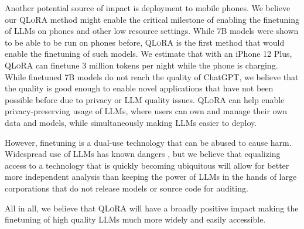 Another potential source of impact is deployment to mobile phones. We believe our \textsc{QLoRA} method might enable the critical milestone of enabling the finetuning of LLMs on phones and other low resource settings. While 7B models were shown to be able to be run on phones before, \textsc{QLoRA} is the first method that would enable the finetuning of such models. We estimate that with an iPhone 12 Plus, \textsc{QLoRA} can finetune 3 million tokens per night while the phone is charging. While finetuned 7B models do not reach the quality of ChatGPT, we believe that the quality is good enough to enable novel applications that have not been possible before due to privacy or LLM quality issues. \textsc{QLoRA} can help enable privacy-preserving usage of LLMs, where users can own and manage their own data and models, while simultaneously making LLMs easier to deploy.

However, finetuning is a dual-use technology that can be abused to cause harm. Widespread use of LLMs has known dangers \citep{bommasani2021opportunities,bender2021dangers}, but we believe that equalizing access to a technology that is quickly becoming ubiquitous will allow for better more independent analysis than keeping the power of LLMs in the hands of large corporations that do not release models or source code for auditing.

All in all, we believe that \textsc{QLoRA} will have a broadly positive impact making the finetuning of high quality LLMs much more widely and easily accessible.

